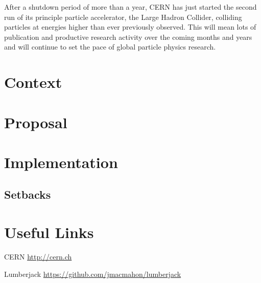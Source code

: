 \documentclass[a4paper,11pt]{article} %
\begin{document}
After a shutdown period of more than a year, CERN has just started the second
run of its principle particle accelerator, the Large Hadron Collider, colliding
particles at energies higher than ever previously observed.  This will mean
lots of publication and productive research activity over the coming months and
years and will continue to set the pace of global particle physics research.

\section{Context}
\label{sec:context}

\section{Proposal}
\label{sec:proposal}

\section{Implementation}
\label{sec:implementation}

\subsection{Setbacks}
\label{sec:setbacks}

\section{Useful Links}
\label{sec:references}

\begin{description*}
  \item[CERN] \url{http://cern.ch}
  \item[Lumberjack] \url{https://github.com/jmacmahon/lumberjack}
\end{description*}
\end{document}

